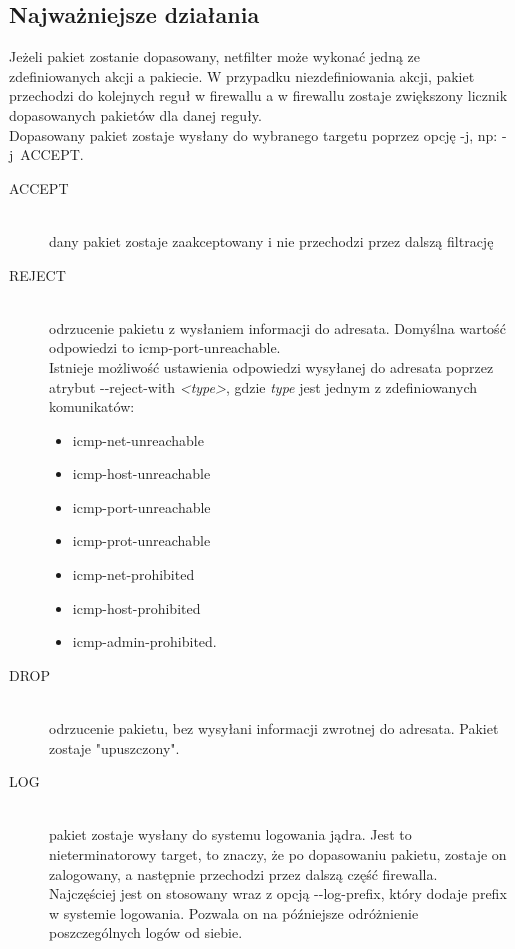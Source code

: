 \documentclass[a4paper,12pt]{book}
\newcommand{\param}[1]{\textit{\textless #1\textgreater}}
\begin{document}
		\subsection{Najważniejsze działania}
			Jeżeli pakiet zostanie dopasowany, netfilter może wykonać jedną ze zdefiniowanych akcji a pakiecie. W przypadku niezdefiniowania akcji, pakiet przechodzi do kolejnych reguł w firewallu a w firewallu zostaje zwiększony licznik dopasowanych pakietów dla danej reguły.\\
			Dopasowany pakiet zostaje wysłany do wybranego targetu poprzez opcję -j, np: -j~ACCEPT.
			\begin{description}
				\item[ACCEPT] \hfill \\
					dany pakiet zostaje zaakceptowany i nie przechodzi przez dalszą filtrację
				\item[REJECT] \hfill \\
					odrzucenie pakietu z wysłaniem informacji do adresata. Domyślna wartość odpowiedzi to icmp-port-unreachable.\\
					Istnieje możliwość ustawienia odpowiedzi wysyłanej do adresata poprzez atrybut -{}-reject-with \param{type},
					gdzie \textit{type} jest jednym z zdefiniowanych komunikatów:
					\begin{itemize}
						\item icmp-net-unreachable
						\item icmp-host-unreachable
						\item icmp-port-unreachable
						\item icmp-prot-unreachable
						\item icmp-net-prohibited
						\item icmp-host-prohibited
						\item icmp-admin-prohibited.
					\end{itemize}
				\item[DROP] \hfill \\
					odrzucenie pakietu, bez wysyłani informacji zwrotnej do adresata. Pakiet zostaje "upuszczony".
				\item[LOG] \hfill \\
					pakiet zostaje wysłany do systemu logowania jądra. Jest to nieterminatorowy target, to znaczy, że po dopasowaniu pakietu, zostaje on zalogowany, a następnie przechodzi przez dalszą część firewalla.\\
					Najczęściej jest on stosowany wraz z opcją -{}-log-prefix, który dodaje prefix w systemie logowania. Pozwala on na późniejsze odróżnienie poszczególnych logów od siebie.

\end{description}
\end{document}
